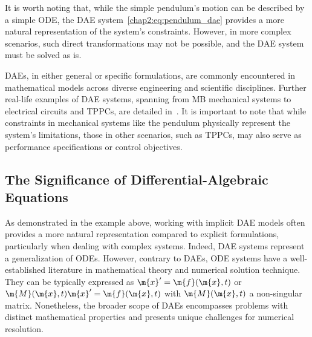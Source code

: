 %
It is worth noting that, while the simple pendulum's motion can be described by a simple \ac{ODE}, the \ac{DAE} system~\eqref{chap2:eq:pendulum_dae} provides a more natural representation of the system's constraints. However, in more complex scenarios, such direct transformations may not be possible, and the \ac{DAE} system must be solved as is.

\acp{DAE}, in either general or specific formulations, are commonly encountered in mathematical models across diverse engineering and scientific disciplines. Further real-life examples of \ac{DAE} systems, spanning from \ac{MB} mechanical systems to electrical circuits and \acp{TPPC}, are detailed in~\cite{brenan1995numerical}. It is important to note that while constraints in mechanical systems like the pendulum physically represent the system's limitations, those in other scenarios, such as \acp{TPPC}, may also serve as performance specifications or control objectives.

\subsection{The Significance of Differential-Algebraic Equations}

As demonstrated in the example above, working with implicit \ac{DAE} models often provides a more natural representation compared to explicit formulations, particularly when dealing with complex systems. Indeed, \ac{DAE} systems represent a generalization of \acp{ODE}. However, contrary to \acp{DAE}, \ac{ODE} systems have a well-established literature in mathematical theory and numerical solution technique. They can be typically expressed as $\m{x}^{\prime} = \m{f}(\m{x}, t)$ or $\m{M}(\m{x}, t)\m{x}^{\prime} = \m{f}(\m{x}, t)$ with $\m{M}(\m{x}, t)$ a non-singular matrix. Nonetheless, the broader scope of \acp{DAE} encompasses problems with distinct mathematical properties and presents unique challenges for numerical resolution.

